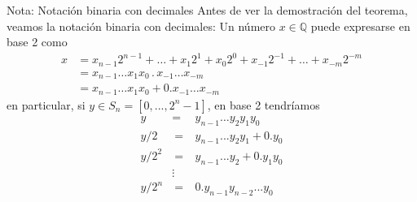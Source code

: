 \documentclass[a4paper,11pt]{book} %
\numberwithin{equation}{chapter}
\begin{document}
	 \begin{mybox_blue}{Nota: Notación binaria con decimales}
	 Antes de ver la demostración del teorema, veamos la notación binaria con decimales: Un número $x \in \mathbb{Q}$ puede expresarse en base 2 como
	 \begin{align*}
	 x & = x_{n-1} 2^{n-1} + \dots + x_1 2^1 + x_0 2^0 + x_{-1} 2^{-1} + \dots + x_{-m} 2^{-m} \\
	   & = x_{n-1} \dots x_1 x_0 \, . \, x_{-1} \dots x_{-m} \\
	   & = x_{n-1} \dots x_1 x_0 + 0.x_{-1} \dots x_{-m}
	 \end{align*}
	 en particular, si $y\in S_n =[0,...,2^n-1]$, en base 2 tendríamos
	\begin{eqnarray}
	y &=& y_{n-1} \ldots   y_2y_1 y_0 \nonumber\\  
	y/2&~=~&  y_{n-1}...y_2y_1 + 0. y_0 \nonumber\\ 
	y/2^2 &~=~&  y_{n-1}...y_2 + 0.y_1 y_0 \nonumber\\ 
	&\vdots & \nonumber \\ 
	y/2^n &~=~&   0.y_{n-1}y_{n-2}...y_0 \, 
	\end{eqnarray}
	 \end{mybox_blue}
	
	
	
\end{document}
